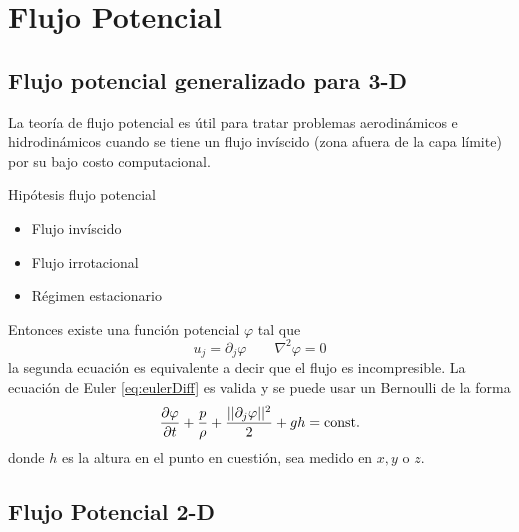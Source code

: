 \section{Flujo Potencial}
\subsection{Flujo potencial generalizado para 3-D}
La teoría de flujo potencial es útil para tratar problemas aerodinámicos e hidrodinámicos cuando se tiene un flujo invíscido (zona afuera de la capa límite) por su bajo costo computacional.

Hipótesis flujo potencial
\begin{itemize}
    \item Flujo invíscido
    \item Flujo irrotacional
    \item Régimen estacionario
\end{itemize}
Entonces existe una función potencial $\varphi$ tal que
\[
u_j = \partial_j \varphi \qquad \nabla^2\varphi = 0
\]
la segunda ecuación es equivalente a decir que el flujo es incompresible. La ecuación de Euler \eqref{eq:eulerDiff} es valida y se puede usar un Bernoulli de la forma
\begin{equation}
    \frac{\partial \varphi}{\partial t}+\frac{p}{\rho}+\frac{||\partial_j \varphi||^2}{2}+gh=\textrm{const.}
\end{equation}
donde $h$ es la altura en el punto en cuestión, sea medido en $x,y$ o $z$.
\subsection{Flujo Potencial 2-D}

